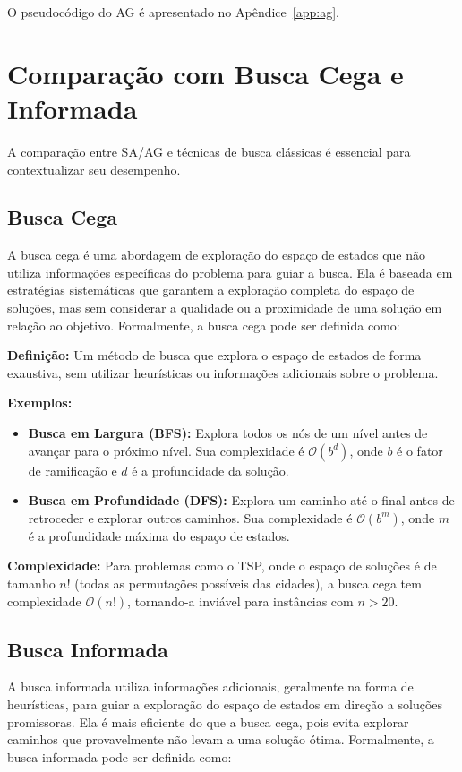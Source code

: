 \documentclass[12pt]{article}
\begin{document}
O pseudocódigo do AG é apresentado no Apêndice~\ref{app:ag}.

\section{Comparação com Busca Cega e Informada}
A comparação entre SA/AG e técnicas de busca clássicas é essencial para contextualizar seu desempenho.

\subsection{Busca Cega}
A busca cega é uma abordagem de exploração do espaço de estados que não utiliza informações específicas do problema para guiar a busca. Ela é baseada em estratégias sistemáticas que garantem a exploração completa do espaço de soluções, mas sem considerar a qualidade ou a proximidade de uma solução em relação ao objetivo. Formalmente, a busca cega pode ser definida como:

\textbf{Definição:} Um método de busca que explora o espaço de estados de forma exaustiva, sem utilizar heurísticas ou informações adicionais sobre o problema.

\textbf{Exemplos:}
\begin{itemize}
    \item \textbf{Busca em Largura (BFS):} Explora todos os nós de um nível antes de avançar para o próximo nível. Sua complexidade é \(\mathcal{O}(b^d)\), onde \(b\) é o fator de ramificação e \(d\) é a profundidade da solução.
    \item \textbf{Busca em Profundidade (DFS):} Explora um caminho até o final antes de retroceder e explorar outros caminhos. Sua complexidade é \(\mathcal{O}(b^m)\), onde \(m\) é a profundidade máxima do espaço de estados.
\end{itemize}

\textbf{Complexidade:} Para problemas como o TSP, onde o espaço de soluções é de tamanho \(n!\) (todas as permutações possíveis das cidades), a busca cega tem complexidade \(\mathcal{O}(n!)\), tornando-a inviável para instâncias com \(n > 20\).

\subsection{Busca Informada}
A busca informada utiliza informações adicionais, geralmente na forma de heurísticas, para guiar a exploração do espaço de estados em direção a soluções promissoras. Ela é mais eficiente do que a busca cega, pois evita explorar caminhos que provavelmente não levam a uma solução ótima. Formalmente, a busca informada pode ser definida como:
\end{document}
